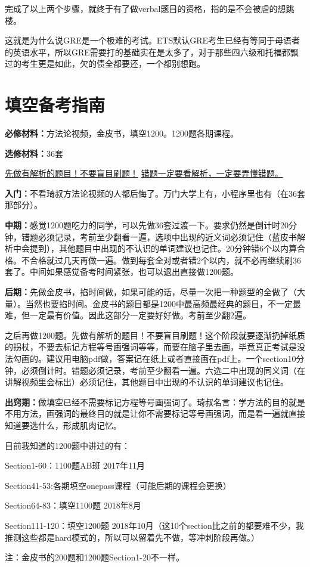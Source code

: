 \documentclass[cn,plain]{./src/qyxfbook}
\newenvironment{material}{\begin{tcolorbox}[title={材料}]}{\end{tcolorbox}}
\newcommand{\red}[1]{\textcolor[rgb]{1,0,0}{#1}}
\begin{document}
			完成了以上两个步骤，就终于有了做verbal题目的资格，指的是不会被虐的想跳楼。

			
			这就是为什么说GRE是一个极难的考试。ETS默认GRE考生已经有等同于母语者的英语水平，所以GRE需要打的基础实在是太多了，对于那些四六级和托福都飘过的考生更是如此，欠的债全都要还，一个都别想跑。
		
	
		\section{填空备考指南}
		\begin{material}
			\textbf{必修材料：}方法论视频，金皮书，填空1200。1200题各期课程。\par
			\textbf{选修材料：}36套

		\end{material}
			\underline{先做有解析的题目！不要盲目刷题！}
			\underline{错题一定要看解析，一定要弄懂错题。}

			\textbf{入门：}不看琦叔方法论视频的人都后悔了。万门大学上有，小程序里也有（在36套那部分）。

			
			\textbf{中期：}感觉1200题吃力的同学，可以先做36套过渡一下。要求仍然是倒计时20分钟，错题必须记录，考前至少翻看一遍，选项中出现的近义词必须记住（蓝皮书解析中会提到），其他题目中出现的不认识的单词建议也记住。\red{20分钟错6个以内算合格。不合格就过几天再做一遍。}做到每套全对或者错2个以内，就不必再继续刷36套了。中间如果感觉备考时间紧张，也可以退出直接做1200题。

			
			\textbf{后期：}先做金皮书，掐时间做，如果可能的话，尽量一次把一种题型的全做了（大量）。当然也要掐时间。金皮书的题目都是1200中最高频最经典的题目，不一定最难，但一定最有价值。因此这部分一定要好好做。\red{考前至少翻2遍。}\par
			之后再做1200题。先做有解析的题目！不要盲目刷题！这个阶段就要逐渐扔掉纸质的拐杖，不要去标记方程等号画强词等等，而要在脑子里去画，毕竟真正考试是没法勾画的。建议用\red{\Large 电脑pdf做}，答案记在纸上或者直接画在pdf上。一个section10分钟，必须倒计时。错题必须记录，考前至少翻看一遍。六选二中出现的同义词（在讲解视频里会标出）必须记住，其他题目中出现的不认识的单词建议也记住。

			
			\textbf{出窍期：}做填空已经不需要标记方程等号画强词了。琦叔名言：学方法的目的就是不用方法，画强词的最终目的就是让你不需要标记等号画强词，而是看一遍就直接知道要选什么，形成肌肉记忆。

			
			目前我知道的1200题中讲过的有：\par
			Section1-60：1100题AB班	2017年11月\par
			Section41-53:各期填空onepass课程（可能后期的课程会更换）\par
			Section64-83：填空1100题	2018年8月\par
			Section111-120：填空1200题	2018年10月（这10个section比之前的都要难不少，我推测这些都是hard模式的，所以可以留着先不做，等冲刺阶段再做。）\par
			注：金皮书的200题和1200题Section1-20不一样。
\end{document}
